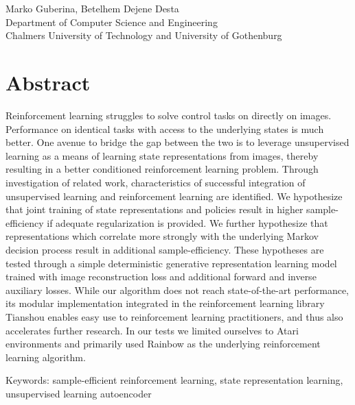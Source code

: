 \oneLineTitle\\
\oneLineSubtitle\\
Marko Guberina,
Betelhem Dejene Desta\\
Department of Computer Science and Engineering\\
Chalmers University of Technology and University of Gothenburg\setlength{\parskip}{0.5cm}

\thispagestyle{plain}			%
\setlength{\parskip}{0pt plus 1.0pt}
\section*{Abstract}
Reinforcement learning struggles to solve control tasks on directly on images.
Performance on identical tasks with access to the underlying states is much better.
One avenue to bridge the gap between the two is to leverage unsupervised learning
as a means of learning state representations from images, thereby resulting
in a better conditioned reinforcement learning problem.
Through investigation of related work, characteristics of successful 
integration of unsupervised learning and reinforcement learning are identified.
We hypothesize that joint training of state representations and policies
result in higher sample-efficiency if adequate regularization is provided.
We further hypothesize that representations which correlate more strongly
with the underlying Markov decision process result in additional sample-efficiency.
These hypotheses are tested through a simple deterministic generative 
representation learning model trained with image reconstruction loss
and additional forward and inverse auxiliary losses.
While our algorithm does not reach state-of-the-art performance,
its modular implementation integrated in the reinforcement learning library Tianshou
enables easy use to reinforcement learning practitioners,
and thus also accelerates further research.
In our tests we limited ourselves to Atari environments
and primarily used Rainbow as the underlying reinforcement learning algorithm.

\vfill
Keywords: sample-efficient reinforcement learning, state representation learning, unsupervised learning
autoencoder


\newpage				%
\thispagestyle{empty}
\mbox{}
